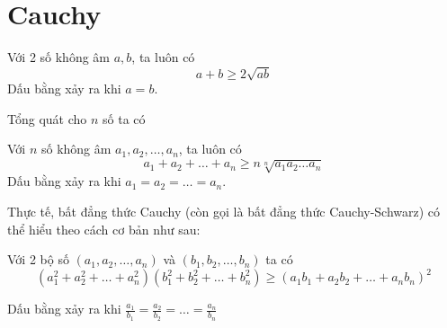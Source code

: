 \chapter{Cauchy}

\begin{theorem}
    Với 2 số không âm $a, b$, ta luôn có
    \[a+b \geq 2 \sqrt{ab}\]
    Dấu bằng xảy ra khi $a = b$.
\end{theorem}

Tổng quát cho $n$ số ta có

\begin{theorem}
    Với $n$ số không âm $a_1, a_2, \ldots, a_n$, ta luôn có
    \[a_1 + a_2 + \ldots + a_n \geq n \sqrt[n]{a_1 a_2 \ldots a_n}\]
    Dấu bằng xảy ra khi $a_1 = a_2 = \ldots = a_n$.
\end{theorem}

Thực tế, bất đẳng thức Cauchy (còn gọi là bất đẳng thức Cauchy-Schwarz) có thể hiểu theo cách cơ bản như sau:

\begin{theorem}
    Với 2 bộ số $(a_1, a_2, \ldots, a_n)$ và $(b_1, b_2, \ldots, b_n)$ ta có
    \[(a_1^2 + a_2^2 + \ldots + a_n^2) (b_1^2 + b_2^2 + \ldots + b_n^2) \geq (a_1 b_1 + a_2 b_2 + \ldots + a_n b_n)^2\]

    Dấu bằng xảy ra khi $\frac{a_1}{b_1} = \frac{a_2}{b_2} = \ldots = \frac{a_n}{b_n}$
\end{theorem}